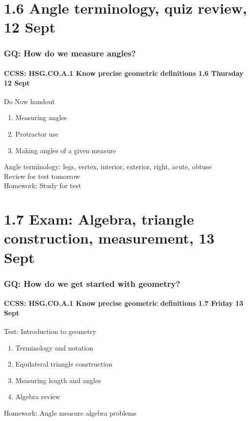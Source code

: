 \documentclass{beamer}
\begin{document}
\section{1.6 Angle terminology, quiz review, 12 Sept}
\frame
{
  \frametitle{GQ: How do we measure angles?}
  \framesubtitle{CCSS: HSG.CO.A.1 Know precise geometric definitions \hfill \alert{1.6 Thursday 12 Sept}}
  \begin{block}{Do Now handout}
  \begin{enumerate}
      \item Measuring angles
      \item Protractor use
      \item Making angles of a given measure
  \end{enumerate}
  \end{block}
  Angle terminology: legs, vertex, interior, exterior, right, acute, obtuse\\
  Review for \alert{test tomorrow} \\
  Homework: Study for test
}

\section{1.7 Exam: Algebra, triangle construction, measurement, 13 Sept}
  \frame
  {
    \frametitle{GQ: How do we get started with geometry?}
    \framesubtitle{CCSS: HSG.CO.A.1 Know precise geometric definitions \hfill \alert{1.7 Friday 13 Sept}}

    \begin{block}{Test: Introduction to geometry}
    \begin{enumerate}
        \item Terminology and notation
        \item Equilateral triangle construction
        \item Measuring length and angles
        \item Algebra review
    \end{enumerate}
    \end{block}

    \vspace{1cm}
    Homework: Angle measure algebra problems\\
  }
\end{document}
